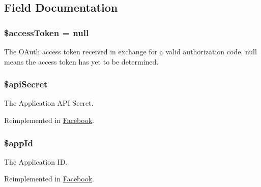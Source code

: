 \subsection{Field Documentation}
\hypertarget{class_base_facebook_a14696362b35353b3280dfbec3f88861d}{
\subsubsection[{\$access\-Token}]{\setlength{\rightskip}{0pt plus 5cm}\$access\-Token = null\hspace{0.3cm}{\ttfamily [protected]}}}\label{class_base_facebook_a14696362b35353b3280dfbec3f88861d}
The O\-Auth access token received in exchange for a valid authorization code. null means the access token has yet to be determined. \hypertarget{class_base_facebook_a50879f00927b420efd4a5e1f495a423d}{
\subsubsection[{\$api\-Secret}]{\setlength{\rightskip}{0pt plus 5cm}\$api\-Secret\hspace{0.3cm}{\ttfamily [protected]}}}\label{class_base_facebook_a50879f00927b420efd4a5e1f495a423d}
The Application A\-P\-I Secret. 

Reimplemented in \hyperlink{class_facebook_a50879f00927b420efd4a5e1f495a423d}{Facebook}.

\hypertarget{class_base_facebook_a37486f0bbe35e62c5ba1e129441b6ac6}{
\subsubsection[{\$app\-Id}]{\setlength{\rightskip}{0pt plus 5cm}\$app\-Id\hspace{0.3cm}{\ttfamily [protected]}}}\label{class_base_facebook_a37486f0bbe35e62c5ba1e129441b6ac6}
The Application I\-D. 

Reimplemented in \hyperlink{class_facebook_a37486f0bbe35e62c5ba1e129441b6ac6}{Facebook}.

